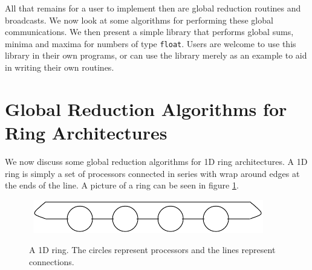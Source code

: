 All that remains for a user to implement then are global reduction
routines and broadcasts. We now look at some algorithms for
performing these global communications. We then present a simple
library that performs global sums, minima and maxima for numbers of
type {\tt float}. Users are welcome to use this library in their own
programs, or can use the library merely as an example to aid in
writing their own routines.

\section{Global Reduction Algorithms for Ring Architectures}
We now discuss some global reduction algorithms for 1D ring architectures.
A 1D ring is simply a set of processors connected in series with 
wrap around edges at the ends of the line. A picture of a ring can
be seen in figure \ref{f:1Dring}.
\begin{figure}
\begin{center}
\leavevmode
\hbox{%
\includegraphics{1Dring}
}
\end{center}
\caption{A 1D ring. The circles represent processors and the lines
represent connections.}
\label{f:1Dring}
\end{figure}

